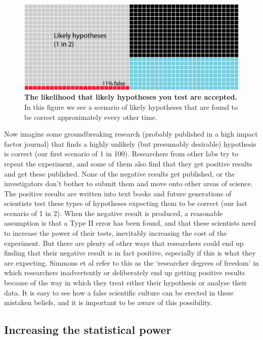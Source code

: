 \documentclass[
]{krantz}
\begin{document}
\begin{figure}
\includegraphics[width=0.9\linewidth]{figures/Likely} \caption{\textbf{The likelihood that likely hypotheses you test are accepted.} In this figure we see a scenario of likely hypotheses that are found to be correct approximately every other time.}\label{fig:Likely}
\end{figure}

Now imagine some groundbreaking research (probably published in a high impact factor journal) that finds a highly unlikely (but presumably desirable) hypothesis is correct (our first scenario of 1 in 100). Researchers from other labs try to repeat the experiment, and some of them also find that they get positive results and get these published. None of the negative results get published, or the investigators don't bother to submit them and move onto other areas of science. The positive results are written into text books and future generations of scientists test these types of hypotheses expecting them to be correct (our last scenario of 1 in 2). When the negative result is produced, a reasonable assumption is that a Type II error has been found, and that these scientists need to increase the power of their tests, inevitably increasing the cost of the experiment. But there are plenty of other ways that researchers could end up finding that their negative result is in fact positive, especially if this is what they are expecting. Simmons et al \citeyearpar{simmons2011false} refer to this as the `researcher degrees of freedom' in which researchers inadvertently or deliberately end up getting positive results because of the way in which they treat either their hypothesis or analyse their data. It is easy to see how a false scientific culture can be erected in these mistaken beliefs, and it is important to be aware of this possibility.

\hypertarget{increasing-the-statistical-power}{%
\subsection{Increasing the statistical power}\label{increasing-the-statistical-power}}
\end{document}
